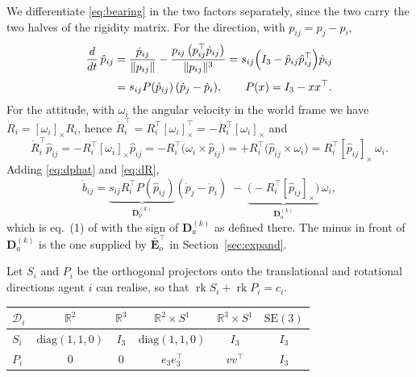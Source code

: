 \documentclass[11pt,a4paper]{article}
\theoremstyle{plain}
\theoremstyle{definition}
\newcommand{\R}{\mathbb{R}}
\newcommand{\SEthree}{\mathrm{SE}(3)}
\newcommand{\rank}{\operatorname{rk}}
\newcommand{\Ebaro}{\bar{\mathbf{E}}_o}
\newcommand{\Dp}{\mathbf{D}_p}
\newcommand{\Da}{\mathbf{D}_a}
\begin{document}
We differentiate \eqref{eq:bearing} in the two factors separately, since the
two carry the two halves of the rigidity matrix. For the direction, with
$p_{ij}=p_j-p_i$,
\begin{align}
  \frac{d}{dt}\,\hat p_{ij}
  &=\frac{\dot p_{ij}}{\lVert p_{ij}\rVert}
    -\frac{p_{ij}\,\bigl(p_{ij}^\top\dot p_{ij}\bigr)}{\lVert p_{ij}\rVert^{3}}
   =s_{ij}\Bigl(I_3-\hat p_{ij}\hat p_{ij}^\top\Bigr)\dot p_{ij}
   \notag\\[2pt]
  &=s_{ij}P(\hat p_{ij})\,(\dot p_j-\dot p_i),
  \qquad P(x)=I_3-xx^\top . \label{eq:dphat}
\end{align}
For the attitude, with $\omega_i$ the angular velocity in the world frame we
have $\dot R_i=[\omega_i]_\times R_i$, hence
$\dot R_i^\top=R_i^\top[\omega_i]_\times^\top=-R_i^\top[\omega_i]_\times$ and
\begin{equation}\label{eq:dR}
  \dot R_i^\top\hat p_{ij}
  =-R_i^\top[\omega_i]_\times\hat p_{ij}
  =-R_i^\top\bigl(\omega_i\times\hat p_{ij}\bigr)
  =+R_i^\top\bigl(\hat p_{ij}\times\omega_i\bigr)
  =R_i^\top[\hat p_{ij}]_\times\,\omega_i .
\end{equation}
Adding \eqref{eq:dphat} and \eqref{eq:dR},
\begin{equation}\label{eq:diff}
  \dot b_{ij}
  =\underbrace{s_{ij}R_i^\top P(\hat p_{ij})}_{\textstyle\Dp^{(k)}}
     (\dot p_j-\dot p_i)
   \;-\;\underbrace{\bigl(-R_i^\top[\hat p_{ij}]_\times\bigr)}_{\textstyle\Da^{(k)}}\,\omega_i ,
\end{equation}
which is eq.~(1) of \cite{michieletto2021} with the sign of $\Da^{(k)}$ as
defined there. The minus in front of $\Da^{(k)}$ is the one supplied by
$\Ebaro^\top$ in Section~\ref{sec:expand}.

Let $S_i$ and $P_i$ be the orthogonal projectors onto the translational and
rotational directions agent $i$ can realise, so that
$\rank S_i+\rank P_i=c_i$.

\begin{center}
\begin{tabular}{lccccc}
\toprule
$\mathcal D_i$ & $\R^2$ & $\R^3$ & $\R^2\times S^1$ & $\R^3\times S^1$ & $\SEthree$\\
\midrule
$S_i$ & $\mathrm{diag}(1,1,0)$ & $I_3$ & $\mathrm{diag}(1,1,0)$ & $I_3$ & $I_3$\\
$P_i$ & $0$ & $0$ & $e_3e_3^\top$ & $vv^\top$ & $I_3$\\
\bottomrule
\end{tabular}
\end{center}
\end{document}
